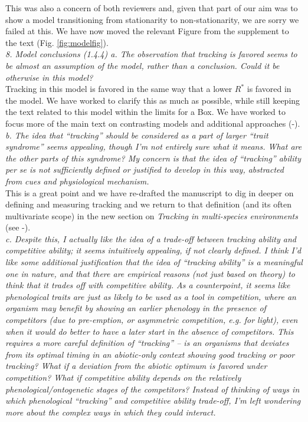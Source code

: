 \documentclass[11pt]{article}
\begin{document}
This was also a concern of both reviewers and, given that part of our aim was to show a model transitioning from stationarity to non-stationarity, we are sorry we failed at this. We have now moved the relevant Figure from the supplement to the text (Fig. \ref{fig:modelfig}). \\

\emph{8.      Model conclusions (1.4.4)
a.      The observation that tracking is favored seems to be almost an assumption of the
model, rather than a conclusion. Could it be otherwise in this model?}\\

Tracking in this model is favored in the same way that a lower $R^*$ is favored in the model. We have worked to clarify this as much as possible, while still keeping the text related to this model within the limits for a Box. We have worked to focus more of the main text on contrasting models and additional approaches (-).\\


\emph{b.      The idea that ``tracking'' should be considered as a part of larger ``trait syndrome''
seems appealing, though I'm not entirely sure what it means. What are the other parts of this
syndrome? My concern is that the idea of ``tracking'' ability per se is not sufficiently
defined or justified to develop in this way, abstracted from cues and physiological
mechanism.}\\

This is a great point and we have re-drafted the manuscript to dig in deeper on defining and measuring tracking and we return to that definition (and its often multivariate scope) in the new section on \emph{Tracking in multi-species environments} (see -).\\

\emph{c.      Despite this, I actually like the idea of a trade-off between tracking ability and
competitive ability; it seems intuitively appealing, if not clearly defined. I think I'd like
some additional justification that the idea of ``tracking ability'' is a meaningful one in
nature, and that there are empirical reasons (not just based on theory) to think that it
trades off with competitive ability. As a counterpoint, it seems like phenological traits are
just as likely to be used as a tool in competition, where an organism may benefit by showing
an earlier phenology in the presence of competitors (due to pre-emption, or asymmetric
competition, e.g. for light), even when it would do better to have a later start in the
absence of competitors. This requires a more careful definition of ``tracking'' – is an
organisms that deviates from its optimal timing in an abiotic-only context showing good
tracking or poor tracking?  What if a deviation from the abiotic optimum is favored under
competition? What if competitive ability depends on the relatively phenological/ontogenetic
stages of the competitors? Instead of thinking of ways in which phenological “tracking” and
competitive ability trade-off, I'm left wondering more about the complex ways in which they
could interact.}\\
\end{document}
